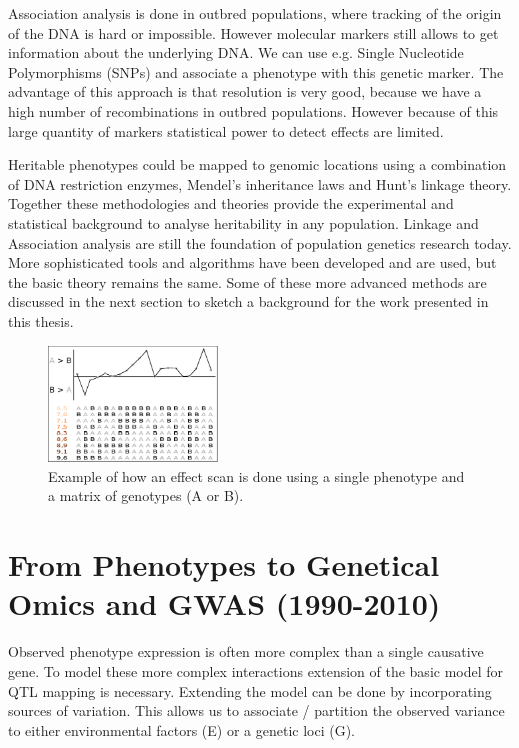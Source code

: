 Association analysis is done in outbred populations, where tracking of the origin of the 
DNA is hard or impossible. However molecular markers still allows to get information 
about the underlying DNA. We can use e.g. Single Nucleotide Polymorphisms (SNPs) and associate 
a phenotype with this genetic marker. The advantage of this approach is that resolution is 
very good, because we have a high number of recombinations in outbred populations. However 
because of this large quantity of markers statistical power to detect effects are limited.

Heritable phenotypes could be mapped to genomic locations using a combination of DNA 
restriction enzymes, Mendel's inheritance laws and Hunt's linkage theory. Together these 
methodologies and theories provide the experimental and statistical background to 
analyse heritability in any population. Linkage and Association analysis are still the 
foundation of population genetics research today. More sophisticated tools and algorithms have been 
developed and are used, but the basic theory remains the same. Some of these more 
advanced methods are discussed in the next section to sketch a background for the work 
presented in this thesis.

\begin{figure}[h!]
 \centering
    \includegraphics[width=0.4\textwidth]{eps/image_1_1}
  \caption[Effect scan across the genome.]
    {Example of how an effect scan is done using a single phenotype and a matrix of genotypes (A or B).}
    \label{fig:effectscan}
\end{figure}

\section{From Phenotypes to Genetical Omics and GWAS (1990-2010)}

Observed phenotype expression is often more complex than a single causative gene. 
To model these more complex interactions extension of the basic model for QTL mapping is 
necessary. Extending the model can be done by incorporating sources of variation. This allows 
us to associate / partition the observed variance to either environmental factors (E) or a 
genetic loci (G).

